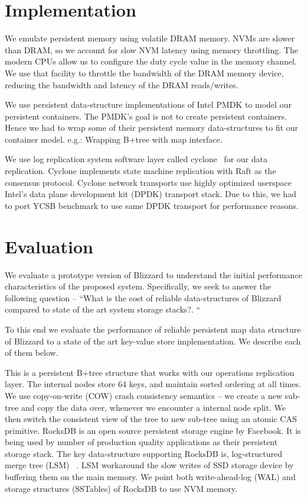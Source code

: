 \section{Implementation}
 We emulate persistent memory using volatile DRAM memory. NVMs are slower than DRAM, so we account for 
slow NVM latency using memory throttling. The modern CPUs allow us to configure the duty cycle value in the memory channel. We use that
facility to throttle the bandwidth of the DRAM memory device, reducing the bandwidth and latency of the DRAM reads/writes. 

We use persistent data-structure implementations of Intel PMDK to model our persistent containers. The PMDK's goal is not to 
create persistent containers. Hence we had to wrap some of their persistent memory data-structures to fit our container model.
e.g.: Wrapping B+tree with map interface.


We use log replication system software layer called cyclone~\cite{cyclone} for our data replication. Cyclone implements 
state machine replication with Raft as the consensus protocol. Cyclone network transports use highly optimized 
userspace Intel's data plane development kit (DPDK) transport stack. Due to this, we had to port YCSB benchmark to
use same DPDK transport for performance reasons.

\section{Evaluation}
We evaluate a prototype version of Blizzard to understand the initial performance characteristics of the proposed
system. Specifically, we seek to answer the following question -- ``What is the cost of reliable data-structures of
Blizzard compared to state of the art system storage stacks?. ``

To this end we evaluate the performance of reliable persistent map data structure of Blizzard to a state of the art
key-value store implementation. We describe each of them below.

This is a persistent B+tree structure that works with our operations replication layer. The internal nodes
store 64 keys, and maintain sorted ordering at all times. We use copy-on-write (COW) crash consistency 
semantics -- we create a new sub-tree and copy the data over, whenever we encounter a internal node split. 
We then switch the consistent view of the tree to new sub-tree using an atomic CAS primitive. 
RocksDB is an open source persistent storage engine by Facebook. It is being used by number of production quality
applications as their persistent storage stack. The key data-structure supporting RocksDB is, log-structured merge
tree (LSM) ~\cite{lsm}. LSM workaround the slow writes of SSD storage device by buffering them on the main memory.
We point both write-ahead-log (WAL) and storage structures (SSTables) of RocksDB to use NVM memory.

